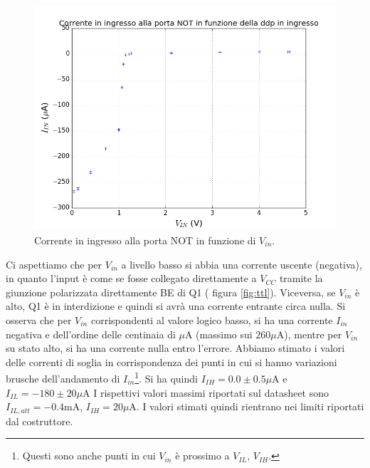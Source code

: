 \documentclass[10pt,a4paper]{article}
\begin{document}
\begin{figure}[!htb]
\centering
\includegraphics[scale=0.9]{viniin.png}
\caption{Corrente in ingresso alla porta NOT in funzione di $V_{in}$.\label{fig:viniin}}
\end{figure}
Ci aspettiamo che per $V_{in}$ a livello basso si abbia una corrente uscente (negativa), in quanto l'input è come se fosse collegato direttamente a $V_{CC}$ tramite la giunzione polarizzata direttamente BE di Q1 ( figura \ref{fig:ttl}). Viceversa, se $V_{in}$ è alto, Q1 è in interdizione e quindi si avrà una corrente entrante circa nulla.
Si osserva che per $V_{in}$ corrispondenti al valore logico basso, si ha una corrente $I_{in}$ negativa e dell'ordine delle centinaia di $\mu \mbox{A}$ (massimo sui $260\mu \mbox{A}$), mentre per $V_{in}$ su stato alto, si ha una corrente nulla entro l'errore.
Abbiamo stimato i valori delle correnti di soglia in corrispondenza dei punti in cui si hanno variazioni brusche dell'andamento di $I_{in}$\footnote{Questi sono anche punti in cui $V_{in}$ è prossimo a $V_{IL}$, $V_{IH}$.}.
Si ha quindi $I_{IH}=0.0\pm0.5\mu \mbox{A}$ e $I_{IL}=-180\pm20\mu\mbox{A}$
I rispettivi valori massimi riportati sul datasheet sono $I_{IL,att}=-0.4\mbox{mA}$, $I_{IH}=20\mu\mbox{A}$. 
I valori stimati quindi rientrano nei limiti riportati dal costruttore. 
\end{document}

